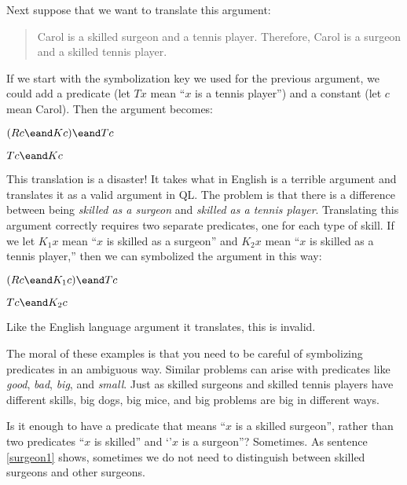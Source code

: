 Next suppose that we want to translate this argument:
\begin{quote}
\label{surgeon3}
Carol is a skilled surgeon and a tennis player. Therefore, Carol is a surgeon and a skilled tennis player.
\end{quote}
If we start with the symbolization key we used for the previous argument, we could add a predicate (let $Tx$ mean ``$x$ is a tennis player'') and a constant (let $c$ mean Carol). Then the argument becomes:
\begin{kormanize}
\item[] $(Rc \eand Kc) \eand Tc$
\item[\therefore] $Tc \eand Kc$
\end{kormanize}
This translation is a disaster! It takes what in English is a terrible argument and translates it as a valid argument in QL. The problem is that there is a difference between being \emph{skilled as a surgeon} and \emph{skilled as a tennis player}. Translating this argument correctly requires two separate predicates, one for each type of skill. If we let $K_1x$ mean ``$x$ is skilled as a surgeon'' and $K_2x$ mean ``$x$ is skilled as a tennis player,'' then we can symbolized the argument in this way:
\begin{kormanize}
\label{surgeon3correct}
\item[] $(Rc \eand K_1c) \eand Tc$
\item[\therefore] $Tc \eand K_2c$
\end{kormanize}
Like the English language argument it translates, this is invalid. %

The moral of these examples is that you need to be careful of symbolizing predicates in an ambiguous way. Similar problems can arise with predicates like \emph{good}, \emph{bad}, \emph{big}, and \emph{small}. Just as skilled surgeons and skilled tennis players have different skills, big dogs, big mice, and big problems are big in different ways.

Is it enough to have a predicate that means ``$x$ is a skilled surgeon'', rather than two predicates ``$x$ is skilled'' and `'$x$ is a surgeon''? Sometimes. As sentence \ref{surgeon1} shows, sometimes we do not need to distinguish between skilled surgeons and other surgeons.

